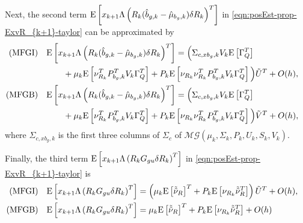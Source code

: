 \begin{theorem}
	Next, the second term $\mathrm{E}\left[ x_{k+1}\Lambda\left( R_k (\hat{b}_{g,k}-\hat{\mu}_{b_g,k}) \delta R_k \right)^T \right]$ in \eqref{eqn:posEst-prop-ExvR_{k+1}-taylor} can be approximated by
	\begin{subequations} \label{eqn:posEst-prop-ExLambda2}
		\allowdisplaybreaks
		\begin{flalign}
			\text{(MFGI)} && &\expect{x_{k+1}\Lambda\left( R_k (\hat{b}_{g,k}-\hat{\mu}_{b_g,k}) \delta R_k \right)^T} = \Big( \Sigma_{c,xb_g,k}V_k\expect{\Gamma_Q^T} && \nonumber \\
			&& &\qquad + \mu_k\expect{\nu_{R_k}^TP_{b_g,k}^TV_k\Gamma_Q^T} + P_k\expect{\nu_{R_k}\nu_{R_k}^TP_{b_g,k}^TV_k\Gamma_Q^T} \Big) \tilde{U}^T + O(h), && \\
			\text{(MFGB)} && &\expect{x_{k+1}\Lambda\left( R_k (\hat{b}_{g,k}-\hat{\mu}_{b_g,k}) \delta R_k \right)^T} = \Big( \Sigma_{c,xb_g,k}V_k\expect{\Gamma_Q^T} && \nonumber \\
			&& &\qquad + \mu_k\expect{\nu_{R_k}^TP_{b_g,k}^TV_k\Gamma_Q^T} + P_k\expect{\nu_{R_k}\nu_{R_k}^TP_{b_g,k}^TV_k\Gamma_Q^T} \Big) \tilde{V}^T + O(h), &&
		\end{flalign}
	\end{subequations}
	where $\Sigma_{c,xb_g,k}$ is the first three columns of $\Sigma_c$ of $\mathcal{MG}(\mu_k,\Sigma_k,P_k,U_k,S_k,V_k)$.
	
	Finally, the third term $\mathrm{E}\left[ x_{k+1}\Lambda\left( R_kG_{gu}\delta R_k \right)^T \right]$ in \eqref{eqn:posEst-prop-ExvR_{k+1}-taylor} is
	\begin{subequations} \label{eqn:posEst-prop-ExLambda3}
		\allowdisplaybreaks
		\begin{flalign}
			\text{(MFGI)} && \expect{x_{k+1}\Lambda\left( R_kG_{gu}\delta R_k \right)^T} &= \left( \mu_k\expect{\tilde{\tilde{\nu}}_R}^T + P_k\expect{\nu_{R_k}\tilde{\tilde{\nu}}_R^T} \right) \tilde{U}^T + O(h), && \\
			\text{(MFGB)} && \expect{x_{k+1}\Lambda\left( R_kG_{gu}\delta R_k \right)^T} &= \mu_k\expect{\tilde{\tilde{\nu}}_R}^T + P_k\expect{\nu_{R_k}\tilde{\tilde{\nu}}_R^T} + O(h) &&
		\end{flalign}
	\end{subequations}
\end{theorem}
